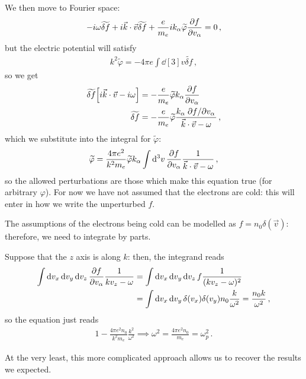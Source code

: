 \documentclass[main.tex]{subfiles}
\begin{document}
We then move to Fourier space: 
%
\begin{align}
- i \omega \widetilde{\delta f} + 
i \vec{k} \cdot \vec{v} \widetilde{\delta f} 
+ \frac{e}{m_e} i k_\alpha  \widetilde{\varphi} \pdv{f}{v_\alpha } = 0
\,,
\end{align}
%
but the electric potential will satisfy 
%
\begin{align}
k^2 \widetilde{\varphi} = - 4 \pi e \int \dd[3]{v} \widetilde{\delta f} 
\,,
\end{align}
%
so we get 
%
\begin{align}
\widetilde{\delta f} \qty[ i \vec{k} \cdot \vec{v} - i \omega ] &= 
- \frac{e}{m_e} \widetilde{\varphi} k_\alpha \pdv{f}{v_\alpha }  \\
\widetilde{\delta f} &= - \frac{e}{m_e} \widetilde{\varphi} \frac{k_\alpha \pdv*{f}{v_\alpha }}{\vec{k} \cdot \vec{v} - \omega }  
\,,
\end{align}
%
which we substitute into the integral for \(\widetilde{\varphi}\): 
%
\begin{align}
\widetilde{\varphi} = \frac{4 \pi e^2}{k^2m_e} \widetilde{\varphi} k_\alpha \int \dd[3]{v}  \pdv{f}{v_\alpha } \frac{1}{\vec{k} \cdot \vec{v} - \omega }
\,,
\end{align}
%
so the allowed perturbations are those which make this equation true (for arbitrary \(\varphi \)). 
For now we have not assumed that the electrons are cold: this will enter in how we write the unperturbed \(f\). 

The assumptions of the electrons being cold can be modelled as \(f = n_0 \delta (\vec{v})\): therefore, we need to integrate by parts. 

Suppose that the \(z\) axis is along \(k\): then, the integrand reads 
%
\begin{align}
\int \dd{v_x} \dd{v_y} \dd{v_z} \pdv{f}{v_\alpha } \frac{1}{k v_z - \omega } &=
\int \dd{v_x} \dd{v_y} \dd{v_z} f \frac{1}{(k v_z - \omega)^2 }  \\
&= \int \dd{v_x} \dd{v_y} \delta (v_x) \delta (v_y) n_0 \frac{k}{\omega^2} = \frac{n_0 k }{ \omega^2}
\,,
\end{align}
%
so the equation just reads 
%
\begin{align}
1 - \frac{4 \pi e^2 n_0 }{k^2 m_e} \frac{k^2}{\omega^2} \implies \omega^2 = \frac{4 \pi e^2 n_0 }{m_e} = \omega_p^2
\,.
\end{align}

At the very least, this more complicated approach allows us to recover the results we expected. 
\end{document}
